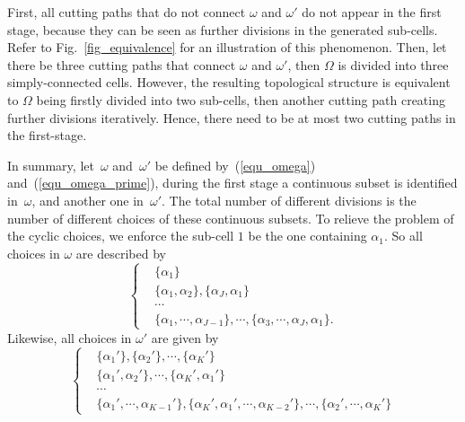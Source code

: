 \documentclass[conference]{IEEEtran}
\begin{document}
First, all cutting paths that do not connect $\omega$ and $\omega'$ do not appear in the first stage, because they can be seen as further divisions in the generated sub-cells. Refer to Fig.~\ref{fig_equivalence} for an illustration of this phenomenon. 
Then, let there be three cutting paths that connect $\omega$ and $\omega'$, then $\Omega$ is divided into three simply-connected cells. However, the resulting topological structure is equivalent to $\Omega$ being firstly divided into two sub-cells, then another cutting path creating further divisions iteratively. Hence, there need to be at most two cutting paths in the first-stage.  

In summary, let~$\omega$ and~$\omega'$ be defined by~(\ref{equ_omega}) and~(\ref{equ_omega_prime}), during the first stage a continuous 
subset is identified in~$\omega$, and another one in~$\omega'$. The total number of different divisions is the number of different choices of these continuous subsets. To relieve the problem of the cyclic choices, we enforce the sub-cell $1$ be the one containing $\alpha_1$. 
So all choices in $\omega$ are described by
\begin{equation}\label{equ_all_omega}
\left\{
\begin{aligned}
&\{\alpha_1\}\\
&\{\alpha_1, \alpha_2\}, \{\alpha_J, \alpha_1\}\\
&\cdots\\
&\{\alpha_1, \cdots, \alpha_{J-1}\}, \cdots, \{\alpha_3, \cdots, \alpha_J, \alpha_1\}.
\end{aligned}
\right.
\end{equation}
Likewise, all choices in $\omega'$ are given by
\begin{equation}\label{equ_all_omega_prime}
\left\{
\begin{aligned}
&\{\alpha_1'\}, \{\alpha_2'\}, \cdots, \{\alpha_K'\}\\
&\{\alpha_1', \alpha_2'\}, \cdots, \{\alpha_K', \alpha_1'\}\\
&\cdots\\
&\{\alpha_1', \cdots, \alpha_{K-1}'\}, \{\alpha_K', \alpha_1', \cdots, \alpha_{K-2}'\}, \cdots, \{\alpha_2', \cdots, \alpha_K'\}
\end{aligned}
\right.
\end{equation}
\end{document}
